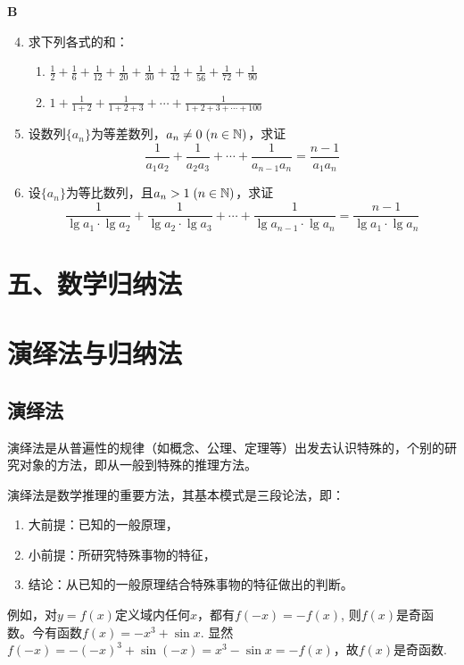 \begin{center}
    \bfseries B
\end{center}

\begin{enumerate}\setcounter{enumi}{3}
    \item 求下列各式的和：
\begin{enumerate}[(1)]
    \item $\frac{1}{2}+\frac{1}{6}+\frac{1}{12}+\frac{1}{20}+\frac{1}{30}+\frac{1}{42}+\frac{1}{56}+\frac{1}{72}+\frac{1}{90}$
    \item $1+\frac{1}{1+2}+\frac{1}{1+2+3}+\cdots+\frac{1}{1+2+3+\cdots +100}$
\end{enumerate}

\item 设数列$\{a_n\}$为等差数列，$a_n\ne 0\; (n\in\mathbb{N})$，求证
\[\frac{1}{a_1a_2}+\frac{1}{a_2a_3}+\cdots +\frac{1}{a_{n-1}a_n}=\frac{n-1}{a_1a_n}\]
\item 设$\{a_n\}$为等比数列，且$a_n>1\; (n\in\mathbb{N})$，求证
\[\frac{1}{\lg a_1\cdot \lg a_2}+\frac{1}{\lg a_2\cdot \lg a_3}+\cdots +\frac{1}{\lg a_{n-1}\cdot \lg a_n}=\frac{n-1}{\lg a_1\cdot \lg a_n}\]

\end{enumerate}


\section*{五、数学归纳法}

\section{演绎法与归纳法}
\subsection{演绎法}
演绎法是从普遍性的规律（如概念、公理、定理等）出发去认识特殊的，个别的研究对象的方法，即从一般到特殊的推理方法。

演绎法是数学推理的重要方法，其基本模式是三段论法，即：
\begin{enumerate}
\item 大前提：已知的一般原理，
\item 小前提：所研究特殊事物的特征，
\item 结论：从已知的一般原理结合特殊事物的特征做出的判断。
\end{enumerate}

例如，对$y=f(x)$定义域内任何$x$，都有$f(-x)=-f(x)$, 则$f(x)$是奇函数。今有函数$f(x)=-x^3+\sin x$. 显然$f(-x)=-(-x)^3+\sin(-x)=x^3-\sin x=-f(x)$，故$f(x)$是奇函数.

